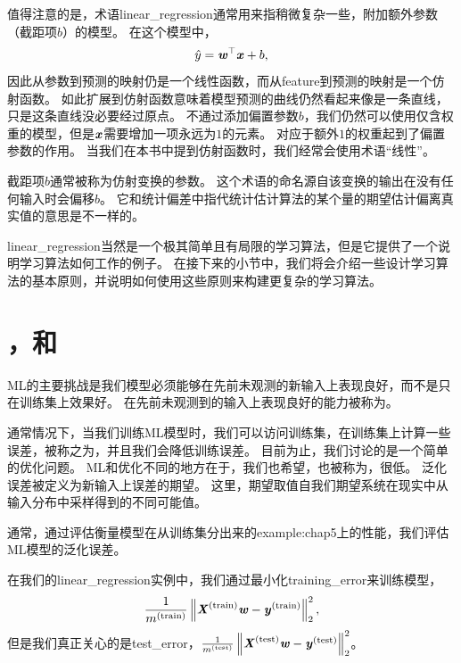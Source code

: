 值得注意的是，术语{\gls{linear_regression}}通常用来指稍微复杂一些，附加额外参数（截距项$b$）的模型。
在这个模型中，
\begin{equation}
    \hat{y} = \boldsymbol{\mathit{w}}^\top \boldsymbol{\mathit{x}} + b,
\end{equation}
因此从参数到预测的映射仍是一个线性函数，而从\gls{feature}到预测的映射是一个仿射函数。
如此扩展到仿射函数意味着模型预测的曲线仍然看起来像是一条直线，只是这条直线没必要经过原点。
不通过添加偏置参数$b$，我们仍然可以使用仅含权重的模型，但是$\boldsymbol{\mathit{x}}$需要增加一项永远为$1$的元素。
对应于额外$1$的权重起到了偏置参数的作用。
当我们在本书中提到仿射函数时，我们经常会使用术语``线性''。


截距项$b$通常被称为仿射变换的参数。
这个术语的命名源自该变换的输出在没有任何输入时会偏移$b$。
它和统计偏差中指代统计估计算法的某个量的期望估计偏离真实值的意思是不一样的。

\gls{linear_regression}当然是一个极其简单且有局限的学习算法，但是它提供了一个说明学习算法如何工作的例子。
在接下来的小节中，我们将会介绍一些设计学习算法的基本原则，并说明如何使用这些原则来构建更复杂的学习算法。

\section{，和}
\label{sec:capacity_overfitting_and_underfitting}
\gls{ML}的主要挑战是我们模型必须能够在先前未观测的新输入上表现良好，而不是只在训练集上效果好。
在先前未观测到的输入上表现良好的能力被称为。

通常情况下，当我们训练\gls{ML}模型时，我们可以访问训练集，在训练集上计算一些误差，被称之为，并且我们会降低训练误差。
目前为止，我们讨论的是一个简单的优化问题。
\gls{ML}和优化不同的地方在于，我们也希望，也被称为，很低。
泛化误差被定义为新输入上误差的期望。
这里，期望取值自我们期望系统在现实中从输入分布中采样得到的不同可能值。

通常，通过评估衡量模型在从训练集分出来的\gls{example:chap5}上的性能，我们评估\gls{ML}模型的泛化误差。

在我们的\gls{linear_regression}实例中，我们通过最小化\gls{training_error}来训练模型，
\begin{equation}
    \frac{1}{m^{(\text{train})}} \left\lVert\boldsymbol{\mathit{X}}^{(\text{train})}\boldsymbol{\mathit{w}} - \boldsymbol{\mathit{y}}^{(\text{train})}\right\rVert_2^2,
\end{equation}
但是我们真正关心的是\gls{test_error}，$\frac{1}{m^{(\text{test})}} \left\lVert\boldsymbol{\mathit{X}}^{(\text{test})}\boldsymbol{\mathit{w}} - \boldsymbol{\mathit{y}}^{(\text{test})}\right\rVert_2^2$。

